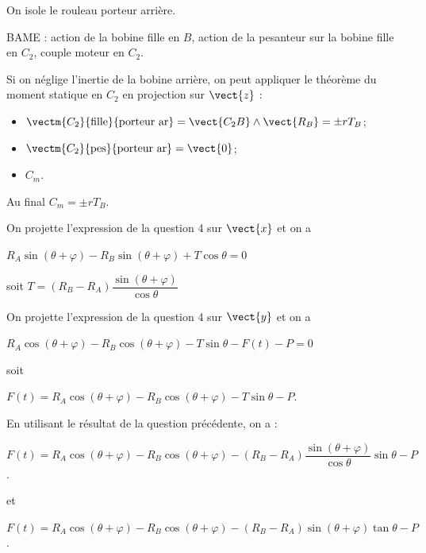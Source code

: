 \ifprof
\begin{corrige}
On isole le rouleau porteur arrière.

BAME : action de la bobine fille en $B$, action de la pesanteur sur la bobine fille en $C_2$, couple moteur en $C_2$. 

Si on néglige l'inertie de la bobine arrière, on peut appliquer le théorème du moment statique en $C_2$ en projection sur $\vect{z}$ :
\begin{itemize}
\item $\vectm{C_2}{\text{fille}}{\text{porteur ar}} = \vect{C_2 B} \wedge \vect{R_B} = \pm r T_B$; 
\item $\vectm{C_2}{\text{pes}}{\text{porteur ar}} = \vect{0}$; 
\item $C_m$.
\end{itemize}
Au final $C_m = \pm r T_B$.

\end{corrige}
\else
\fi


\ifprof
\begin{corrige}
On projette l'expression de la question 4 sur $\vect{x}$ et on a 

$R_A \sin \left(\theta+\varphi\right) - R_B\sin \left(\theta+\varphi\right) + T \cos\theta = 0$

soit
$T =\left(R_B  -R_A\right) \dfrac{\sin \left(\theta+\varphi\right)}{\cos\theta } $
\end{corrige}
\else
\fi


\ifprof
\begin{corrige}
On projette l'expression de la question 4 sur $\vect{y}$ et on a 

\noindent $R_A \cos \left(\theta+\varphi\right) - R_B\cos \left(\theta+\varphi\right) - T \sin\theta -F(t)-P= 0$ 

soit

$F(t)=R_A \cos \left(\theta+\varphi\right) - R_B\cos \left(\theta+\varphi\right) - T \sin\theta -P$.

En utilisant le résultat de la question précédente, on a : 

$F(t)=R_A \cos \left(\theta+\varphi\right) - R_B\cos \left(\theta+\varphi\right) - \left(R_B  -R_A\right) \dfrac{\sin \left(\theta+\varphi\right)}{\cos\theta } \sin\theta -P$.

et


$F(t)=R_A \cos \left(\theta+\varphi\right) - R_B\cos \left(\theta+\varphi\right) - \left(R_B  -R_A\right)\sin \left(\theta+\varphi\right)  \tan \theta -P$.

\end{corrige}
\else
\fi


